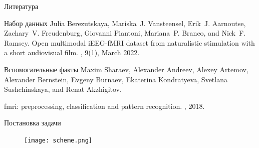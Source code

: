 \documentclass[9pt,pdf]{beamer} %
\begin{document}
\begin{frame}{Литература}
    \begin{block}{Набор данных}
    Julia Berezutskaya, Mariska~J. Vansteensel, Erik~J. Aarnoutse, Zachary~V. Freudenburg, Giovanni Piantoni, Mariana~P. Branco, and Nick~F. Ramsey.
    \newblock Open multimodal {iEEG}-{fMRI} dataset from naturalistic stimulation with a short audiovisual film.
    , 9(1), March 2022.
    \end{block}

    \begin{block}{Вспомогательные факты}
        Maxim Sharaev, Alexander Andreev, Alexey Artemov, Alexander Bernstein, Evgeny Burnaev, Ekaterina Kondratyeva, Svetlana Sushchinskaya, and Renat Akzhigitov.
        
        \newblock fmri: preprocessing, classification and pattern recognition.
        , 2018.
    \end{block}
\end{frame}
\begin{frame}{Постановка задачи}
    \begin{figure}[h!]
        \centering
        \texttt{[image: scheme.png]}
    \end{figure}
\end{frame}
\end{document}
